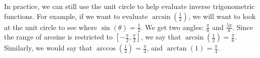 In practice, we can still use the unit circle to help evaluate inverse trigonometric functions. For example, if we want to evaluate $\arcsin{(\frac{1}{2})}$, we will want to look at the unit circle to see where $\sin{(\theta)}=\frac{1}{2}$. We get two angles: $\frac{\pi}{6}$ and $\frac{5\pi}{6}$. Since the range of arcsine is restricted to $[-\frac{\pi}{2},\frac{\pi}{2}]$, we say that $\arcsin{(\frac{1}{2})} = \frac{\pi}{6}$. Similarly, we would say that $\arccos{(\frac{1}{2})} = \frac{\pi}{3}$, and $\arctan{(1)} =\frac{\pi}{4}$.




